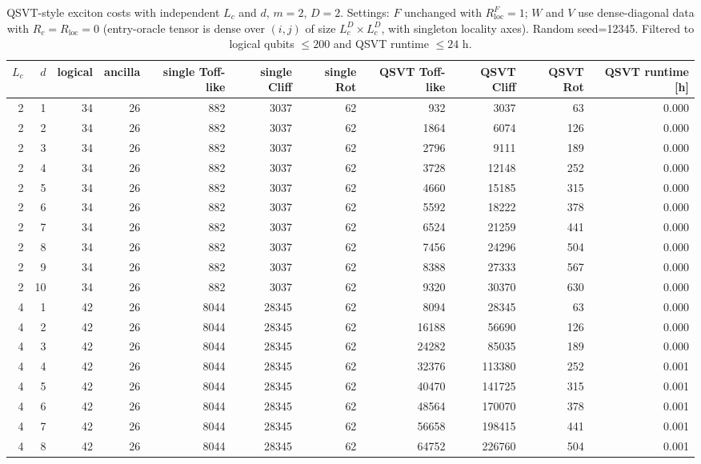\begin{table}[t]
\centering
\scriptsize
\caption{QSVT-style exciton costs with independent $L_c$ and $d$, $m=2$, $D=2$. Settings: $F$ unchanged with $R_{\mathrm{loc}}^F=1$; $W$ and $V$ use dense-diagonal data with $R_c=R_{\mathrm{loc}}=0$ (entry-oracle tensor is dense over $(i,j)$ of size $L_c^D\times L_c^D$, with singleton locality axes). Random seed=12345. Filtered to logical qubits $\leq 200$ and QSVT runtime $\leq 24$ h.}
\begin{tabularx}{\linewidth}{rrrrrrrrrrr}
\toprule
$L_c$ & $d$ & logical & ancilla & single Toff-like & single Cliff & single Rot & QSVT Toff-like & QSVT Cliff & QSVT Rot & QSVT runtime [h] \\
\midrule
2 & 1 & 34 & 26 & 882 & 3037 & 62 & 932 & 3037 & 63 & 0.000 \\
2 & 2 & 34 & 26 & 882 & 3037 & 62 & 1864 & 6074 & 126 & 0.000 \\
2 & 3 & 34 & 26 & 882 & 3037 & 62 & 2796 & 9111 & 189 & 0.000 \\
2 & 4 & 34 & 26 & 882 & 3037 & 62 & 3728 & 12148 & 252 & 0.000 \\
2 & 5 & 34 & 26 & 882 & 3037 & 62 & 4660 & 15185 & 315 & 0.000 \\
2 & 6 & 34 & 26 & 882 & 3037 & 62 & 5592 & 18222 & 378 & 0.000 \\
2 & 7 & 34 & 26 & 882 & 3037 & 62 & 6524 & 21259 & 441 & 0.000 \\
2 & 8 & 34 & 26 & 882 & 3037 & 62 & 7456 & 24296 & 504 & 0.000 \\
2 & 9 & 34 & 26 & 882 & 3037 & 62 & 8388 & 27333 & 567 & 0.000 \\
2 & 10 & 34 & 26 & 882 & 3037 & 62 & 9320 & 30370 & 630 & 0.000 \\
4 & 1 & 42 & 26 & 8044 & 28345 & 62 & 8094 & 28345 & 63 & 0.000 \\
4 & 2 & 42 & 26 & 8044 & 28345 & 62 & 16188 & 56690 & 126 & 0.000 \\
4 & 3 & 42 & 26 & 8044 & 28345 & 62 & 24282 & 85035 & 189 & 0.000 \\
4 & 4 & 42 & 26 & 8044 & 28345 & 62 & 32376 & 113380 & 252 & 0.001 \\
4 & 5 & 42 & 26 & 8044 & 28345 & 62 & 40470 & 141725 & 315 & 0.001 \\
4 & 6 & 42 & 26 & 8044 & 28345 & 62 & 48564 & 170070 & 378 & 0.001 \\
4 & 7 & 42 & 26 & 8044 & 28345 & 62 & 56658 & 198415 & 441 & 0.001 \\
4 & 8 & 42 & 26 & 8044 & 28345 & 62 & 64752 & 226760 & 504 & 0.001 \\

\end{tabularx}
\end{table}
